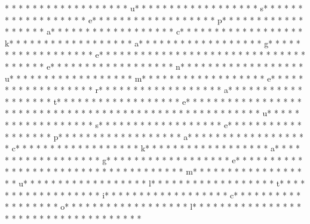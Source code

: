 * * *  * * *  * * *  *  * * *  *  * * *  * u* * *  * * *  * * *  *  * * *  *  * * *  * s* * *  * * *  * * *  *  * * *  *  * * *  * e* * *  * * *  * * *  *  * * *  *  * * *  * p* * *  * * *  * * *  *  * * *  *  * * *  * a* * *  * * *  * * *  *  * * *  *  * * *  * c* * *  * * *  * * *  *  * * *  *  * * *  * k* * *  * * *  * * *  *  * * *  *  * * *  * a* * *  * * *  * * *  *  * * *  *  * * *  * g* * *  * * *  * * *  *  * * *  *  * * *  * e* * *  * * *  * * *  *  * * *  *  * * *  * {* * *  * * *  * * *  *  * * *  *  * * *  * e* * *  * * *  * * *  *  * * *  *  * * *  * n* * *  * * *  * * *  *  * * *  *  * * *  * u* * *  * * *  * * *  *  * * *  *  * * *  * m* * *  * * *  * * *  *  * * *  *  * * *  * e* * *  * * *  * * *  *  * * *  *  * * *  * r* * *  * * *  * * *  *  * * *  *  * * *  * a* * *  * * *  * * *  *  * * *  *  * * *  * t* * *  * * *  * * *  *  * * *  *  * * *  * e* * *  * * *  * * *  *  * * *  *  * * *  * }* * *  * * *  * * *  *  * * *  *  * * *  * %
* * *  * * *  * * *  *  * * *  *  * * *  * u* * *  * * *  * * *  *  * * *  *  * * *  * s* * *  * * *  * * *  *  * * *  *  * * *  * e* * *  * * *  * * *  *  * * *  *  * * *  * p* * *  * * *  * * *  *  * * *  *  * * *  * a* * *  * * *  * * *  *  * * *  *  * * *  * c* * *  * * *  * * *  *  * * *  *  * * *  * k* * *  * * *  * * *  *  * * *  *  * * *  * a* * *  * * *  * * *  *  * * *  *  * * *  * g* * *  * * *  * * *  *  * * *  *  * * *  * e* * *  * * *  * * *  *  * * *  *  * * *  * {* * *  * * *  * * *  *  * * *  *  * * *  * m* * *  * * *  * * *  *  * * *  *  * * *  * u* * *  * * *  * * *  *  * * *  *  * * *  * l* * *  * * *  * * *  *  * * *  *  * * *  * t* * *  * * *  * * *  *  * * *  *  * * *  * i* * *  * * *  * * *  *  * * *  *  * * *  * c* * *  * * *  * * *  *  * * *  *  * * *  * o* * *  * * *  * * *  *  * * *  *  * * *  * l* * *  * * *  * * *  *  * * *  *  * * *  * }* * *  * * *  * * *  *  * * *  *  * * *  * 
